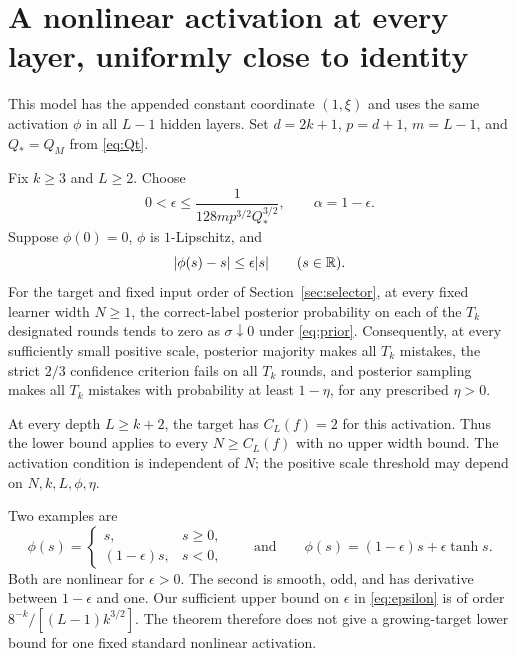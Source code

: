 \section{A nonlinear activation at every layer, uniformly close to identity}
\label{sec:near}

This model has the appended constant coordinate $(1,\xi)$ and uses the
same activation $\phi$ in all $L-1$ hidden layers. Set $d=2k+1$,
$p=d+1$, $m=L-1$, and $Q_*=Q_M$ from \eqref{eq:Qt}.

\begin{theorem}\label{thm:near}
Fix $k\ge3$ and $L\ge2$. Choose
\begin{equation}\label{eq:epsilon}
 0<\epsilon\le
       \frac1{128m p^{3/2}Q_*^{3/2}},\qquad \alpha=1-\epsilon.
\end{equation}
Suppose $\phi(0)=0$, $\phi$ is $1$-Lipschitz, and
\begin{equation}\label{eq:close-id}
 |\phi(s)-s|\le\epsilon|s|\qquad(s\in\mathbb R).
\end{equation}
For the target and fixed input order of Section~\ref{sec:selector}, at
every fixed learner width $N\ge1$, the correct-label posterior
probability on each of the $T_k$ designated rounds tends to zero as
$\sigma\downarrow0$ under \eqref{eq:prior}. Consequently, at every
sufficiently small positive scale, posterior majority makes all $T_k$
mistakes, the strict $2/3$ confidence criterion fails on all $T_k$ rounds,
and posterior sampling makes all $T_k$ mistakes with probability at
least $1-\eta$, for any prescribed $\eta>0$.

At every depth $L\ge k+2$, the target has $C_L(f)=2$ for this activation.
Thus the lower bound applies to every $N\ge C_L(f)$ with no upper width
bound. The activation condition is independent of $N$; the positive
scale threshold may depend on $N,k,L,\phi,\eta$.
\end{theorem}

Two examples are
\[
 \phi(s)=\begin{cases}s,&s\ge0,\\(1-\epsilon)s,&s<0,\end{cases}
 \qquad\text{and}\qquad
 \phi(s)=(1-\epsilon)s+\epsilon\tanh s.
\]
Both are nonlinear for $\epsilon>0$. The second is smooth,
odd, and has derivative between $1-\epsilon$ and one. Our sufficient upper bound on $\epsilon$ in \eqref{eq:epsilon} is of
order $8^{-k}/[(L-1)k^{3/2}]$.
The theorem therefore does not give a growing-target lower bound for
one fixed standard nonlinear activation.

